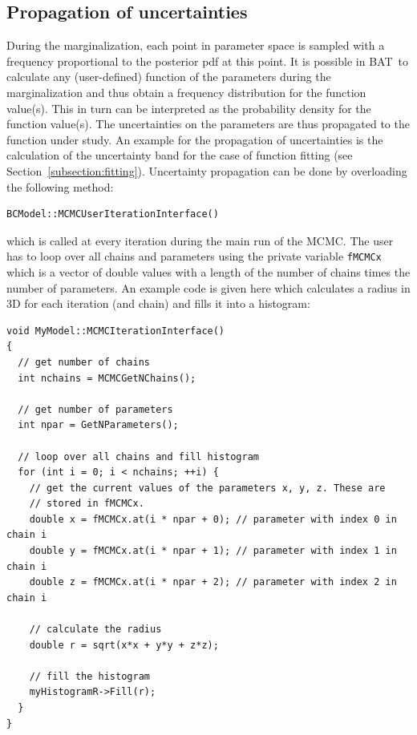 \documentclass[11pt, a4paper]{article}
\newcommand{\bat}{{\sc BAT}}
\begin{document}

\subsection{Propagation of uncertainties}

During the marginalization, each point in parameter space is sampled
with a frequency proportional to the posterior pdf at this point. It
is possible in \bat\ to calculate any (user-defined) function of the
parameters during the marginalization and thus obtain a frequency
distribution for the function value(s). This in turn can be
interpreted as the probability density for the function value(s). The
uncertainties on the parameters are thus propagated to the function
under study. An example for the propagation of uncertainties is the
calculation of the uncertainty band for the case of function fitting
(see Section~\ref{subsection:fitting}).  Uncertainty propagation can
be done by overloading the following method:
%
\begin{verbatim}
BCModel::MCMCUserIterationInterface()
\end{verbatim}
%
which is called at every iteration during the main run of the
MCMC. The user has to loop over all chains and parameters using the
private variable \verb|fMCMCx| which is a vector of double values with
a length of the number of chains times the number of parameters. An
example code is given here which calculates a radius in 3D for each
iteration (and chain) and fills it into a histogram:

\begin{verbatim}
void MyModel::MCMCIterationInterface()
{
  // get number of chains
  int nchains = MCMCGetNChains();

  // get number of parameters
  int npar = GetNParameters();

  // loop over all chains and fill histogram
  for (int i = 0; i < nchains; ++i) {
    // get the current values of the parameters x, y, z. These are
    // stored in fMCMCx.
    double x = fMCMCx.at(i * npar + 0); // parameter with index 0 in chain i
    double y = fMCMCx.at(i * npar + 1); // parameter with index 1 in chain i
    double z = fMCMCx.at(i * npar + 2); // parameter with index 2 in chain i

    // calculate the radius
    double r = sqrt(x*x + y*y + z*z);

    // fill the histogram
    myHistogramR->Fill(r);
  }
}
\end{verbatim}
\end{document}
